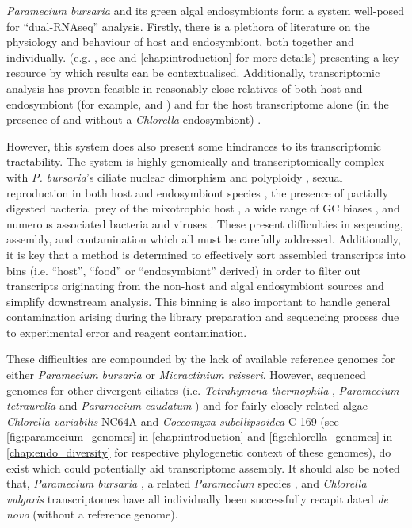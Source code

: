 \textit{Paramecium bursaria} and its green algal endosymbionts form a system well-posed
for ``dual-RNAseq'' analysis.  Firstly, there is a plethora 
of literature on the physiology and behaviour of host and endosymbiont, both together and individually.
(e.g. \citep{Iwatsuki1988}, see \citep{Kato2009a} and \ref{chap:introduction} for more details) presenting 
a key resource by which results can be contextualised.
Additionally, transcriptomic analysis has proven feasible in reasonably close relatives of both host and endosymbiont 
(for example, \citep{Guarnieri2011,Rowe2014,Bashan2015} and \citep{Arnaiz2010,Kolisko2014}) and
for the host transcriptome alone (in the presence of and without a \textit{Chlorella} endosymbiont) \citep{Kodama2014}.

However, this system does also present some hindrances to its transcriptomic tractability.
The system is highly genomically and transcriptomically complex with \textit{P. bursaria}'s ciliate nuclear
dimorphism and polyploidy \citep{Raikov1995}, sexual reproduction in both host \citep{Jennings1939} and endosymbiont species \citep{Blanc2010},
the presence of partially digested bacterial prey of the mixotrophic host \citep{Dolan1992}, a wide range of GC biases \citep{Kodama2014}, and numerous
associated bacteria \citep{Gortz2009,Fokin2009,Schrallhammer2009} and viruses \citep{VanEtten1983}.
These present difficulties in seqencing, assembly, and contamination which all must be carefully addressed.
Additionally, it is key that a method is determined to effectively sort assembled transcripts into
bins (i.e. ``host'', ``food'' or ``endosymbiont'' derived) in order to filter out 
transcripts originating from the non-host and algal endosymbiont sources and simplify downstream analysis.
This binning is also important to handle general contamination arising during the library preparation and sequencing
process due to experimental error and reagent contamination.  


These difficulties are compounded by the lack of available reference genomes for either \textit{Paramecium bursaria} or \textit{Micractinium reisseri}.
However, sequenced genomes for other divergent ciliates (i.e. \textit{Tetrahymena thermophila} \citep{Eisen2006}, \textit{Paramecium tetraurelia} \citep{Aury2006} and \textit{Paramecium caudatum}
\citep{McGrath2014}) and for fairly closely related algae \textit{Chlorella variabilis} NC64A \citep{Blanc2010} and \textit{Coccomyxa subellipsoidea} C-169 \citep{Blanc2012}
(see \ref{fig:paramecium_genomes} in \ref{chap:introduction} and \ref{fig:chlorella_genomes} in \ref{chap:endo_diversity} for respective phylogenetic context of these genomes), 
do exist which could potentially aid transcriptome assembly. It should also be noted that, \textit{Paramecium bursaria} \citep{Kodama2014}, 
a related \textit{Paramecium} species \citep{Kolisko2014}, and \textit{Chlorella vulgaris} \citep{Guarnieri2011} transcriptomes 
have all individually been successfully recapitulated \textit{de novo} (without a reference genome).


